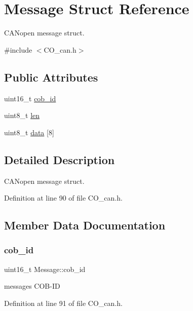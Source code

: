 \hypertarget{struct_message}{}\section{Message Struct Reference}
\label{struct_message}


C\+A\+Nopen message struct.  




{\ttfamily \#include $<$C\+O\+\_\+can.\+h$>$}

\subsection*{Public Attributes}
\begin{DoxyCompactItemize}
\item 
uint16\+\_\+t \mbox{\hyperlink{struct_message_a3e568dd631509c2b326f6b124f7de407}{cob\+\_\+id}}
\item 
uint8\+\_\+t \mbox{\hyperlink{struct_message_a0e2f37b0ed471c18c4d1a71a23981c23}{len}}
\item 
uint8\+\_\+t \mbox{\hyperlink{struct_message_a605b149e9987071433ebb36b43353526}{data}} \mbox{[}8\mbox{]}
\end{DoxyCompactItemize}


\subsection{Detailed Description}
C\+A\+Nopen message struct. 

Definition at line 90 of file C\+O\+\_\+can.\+h.



\subsection{Member Data Documentation}
\mbox{\label{struct_message_a3e568dd631509c2b326f6b124f7de407}} 
\subsubsection{\texorpdfstring{cob\+\_\+id}{cob\_id}}
{\footnotesize\ttfamily uint16\+\_\+t Message\+::cob\+\_\+id}

message\textquotesingle{}s C\+O\+B-\/\+ID 

Definition at line 91 of file C\+O\+\_\+can.\+h.

